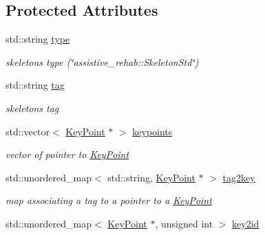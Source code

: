 \subsection*{Protected Attributes}
\begin{DoxyCompactItemize}
\item 
\mbox{\label{classassistive__rehab_1_1Skeleton_a679b826030f01f307d938e583f27d23b}} 
std\+::string \mbox{\hyperlink{classassistive__rehab_1_1Skeleton_a679b826030f01f307d938e583f27d23b}{type}}
\begin{DoxyCompactList}\small\item\em skeleton\textquotesingle{}s type (\char`\"{}assistive\+\_\+rehab\+::\+Skeleton\+Std\char`\"{}) \end{DoxyCompactList}\item 
\mbox{\label{classassistive__rehab_1_1Skeleton_a3d1ce5280300e012826948dc4383c2cb}} 
std\+::string \mbox{\hyperlink{classassistive__rehab_1_1Skeleton_a3d1ce5280300e012826948dc4383c2cb}{tag}}
\begin{DoxyCompactList}\small\item\em skeleton\textquotesingle{}s tag \end{DoxyCompactList}\item 
\mbox{\label{classassistive__rehab_1_1Skeleton_a5f61fbdd10430985cd6754e182226787}} 
std\+::vector$<$ \mbox{\hyperlink{classassistive__rehab_1_1KeyPoint}{Key\+Point}} $\ast$ $>$ \mbox{\hyperlink{classassistive__rehab_1_1Skeleton_a5f61fbdd10430985cd6754e182226787}{keypoints}}
\begin{DoxyCompactList}\small\item\em vector of pointer to \mbox{\hyperlink{classassistive__rehab_1_1KeyPoint}{Key\+Point}} \end{DoxyCompactList}\item 
\mbox{\label{classassistive__rehab_1_1Skeleton_ada4d4b327f1f71520e62e42db9d4c656}} 
std\+::unordered\+\_\+map$<$ std\+::string, \mbox{\hyperlink{classassistive__rehab_1_1KeyPoint}{Key\+Point}} $\ast$ $>$ \mbox{\hyperlink{classassistive__rehab_1_1Skeleton_ada4d4b327f1f71520e62e42db9d4c656}{tag2key}}
\begin{DoxyCompactList}\small\item\em map associating a tag to a pointer to a \mbox{\hyperlink{classassistive__rehab_1_1KeyPoint}{Key\+Point}} \end{DoxyCompactList}\item 
\mbox{\label{classassistive__rehab_1_1Skeleton_a4b1c3607cabb58053e4c367015e98e28}} 
std\+::unordered\+\_\+map$<$ \mbox{\hyperlink{classassistive__rehab_1_1KeyPoint}{Key\+Point}} $\ast$, unsigned int $>$ \mbox{\hyperlink{classassistive__rehab_1_1Skeleton_a4b1c3607cabb58053e4c367015e98e28}{key2id}}

\end{DoxyCompactItemize}
